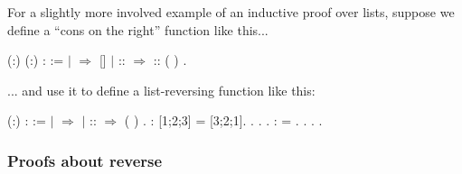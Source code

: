\documentclass[12pt]{report}
\begin{document}
 For a slightly more involved example of an inductive proof
    over lists, suppose we define a ``cons on the right'' function
     like this... \begin{coqdoccode}
\coqdocemptyline
\coqdocnoindent
{}  (:) (:) :  := \coqdoceol
\coqdocindent{1.00em}
  \coqdoceol
\coqdocindent{1.00em}
\ensuremath{|}     \ensuremath{\Rightarrow} []\coqdoceol
\coqdocindent{1.00em}
\ensuremath{|}  ::  \ensuremath{\Rightarrow}  :: (  )\coqdoceol
\coqdocindent{1.00em}
.\coqdoceol
\coqdocemptyline
\end{coqdoccode}
... and use it to define a list-reversing function 
    like this: \begin{coqdoccode}
\coqdocemptyline
\coqdocnoindent
{}  (:) :  := \coqdoceol
\coqdocindent{1.00em}
  \coqdoceol
\coqdocindent{1.00em}
\ensuremath{|}     \ensuremath{\Rightarrow} \coqdoceol
\coqdocindent{1.00em}
\ensuremath{|}  ::  \ensuremath{\Rightarrow}  ( ) \coqdoceol
\coqdocindent{1.00em}
.\coqdoceol
\coqdocemptyline
\coqdocnoindent
{} :             [1;2;3] = [3;2;1].\coqdoceol
\coqdocnoindent
{}. . .\coqdoceol
\coqdocnoindent
{} :              = .\coqdoceol
\coqdocnoindent
{}. . .\coqdoceol
\coqdocemptyline
\end{coqdoccode}
\subsubsection{Proofs about reverse}
\end{document}
